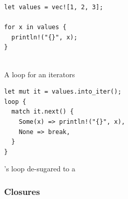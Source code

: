 \begin{listing}[!h]
\begin{minipage}{0.45\textwidth}
  \begin{listing}[H]
    \begin{verbatim}
let values = vec![1, 2, 3];

for x in values {
  println!("{}", x);
}


    \end{verbatim}
    \caption{A  loop for an iterators}
    \label{lst:rust:for}
  \end{listing}
\end{minipage}
\begin{minipage}{0.45\textwidth}
  \begin{listing}[H]
    \begin{verbatim}
let mut it = values.into_iter();
loop {
  match it.next() {
    Some(x) => println!("{}", x),
    None => break,
  }
}
    \end{verbatim}
    \caption{\rust's  loop de-sugared to a }
    \label{lst:rust:desugared-for}
  \end{listing}
\end{minipage}
\end{listing}




\subsubsection{Closures}
\label{sec:back:rust:closures}


